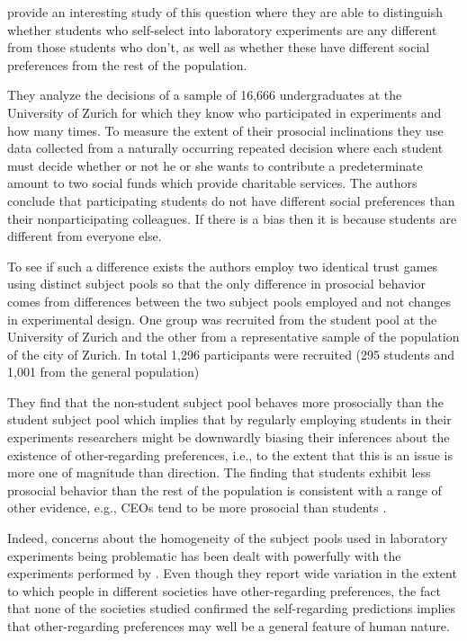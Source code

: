 \documentclass[12pt]{article}
\begin{document}
\cite{falk2013lab} provide an interesting study of this question where they are able to distinguish whether students who self-select into laboratory experiments are any different from those students who don't, as well as whether these have different social preferences from the rest of the population. 

They analyze the decisions of a sample of 16,666 undergraduates at the University of Zurich for which they know who participated in experiments and how many times. To measure the extent of their prosocial inclinations they use data collected from a naturally occurring repeated decision where each student must decide whether or not he or she wants to contribute a predeterminate amount to two social funds which provide charitable services. The authors conclude that participating students do not have different social preferences than their nonparticipating colleagues. If there is a bias then it is because students are different from everyone else.

To see if such a difference exists the authors employ two identical trust games using distinct subject pools so that the only difference in prosocial behavior comes from differences between the two subject pools employed and not changes in experimental design. One group was recruited from the student pool at the University of Zurich and the other from a representative sample of the population of the city of Zurich. In total 1,296 participants were recruited (295 students and 1,001 from the general population) 

They find that the non-student subject pool behaves more prosocially than the student subject pool which implies that by regularly employing students in their experiments researchers might be downwardly biasing their inferences about the existence of other-regarding preferences, i.e., to the extent that this is an issue is more one of magnitude than direction. The finding that students exhibit less prosocial behavior than the rest of the population is consistent with a range of other evidence, e.g., CEOs tend to be more prosocial than students \citep{fehr2004hidden}.

Indeed, concerns about the homogeneity of the subject pools used in laboratory experiments being problematic has been dealt with powerfully with the experiments performed by \cite{henrich2005economic}. Even though they report wide variation in the extent to which people in different societies have other-regarding preferences, the fact that none of the societies studied confirmed the self-regarding predictions implies that other-regarding preferences may well be a general feature of human nature. 
\end{document}
